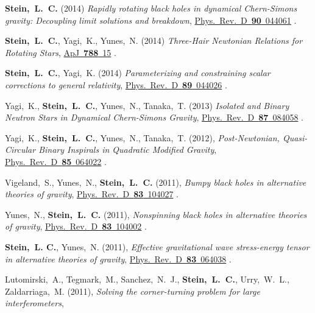 \begin{etaremune}[start=\value{pubCounter}]
\item
  {\bf Stein,~L.~C.}
  (2014)
  {\it Rapidly rotating black holes in dynamical Chern-Simons gravity:
    Decoupling limit solutions and breakdown},
  \href{http://dx.doi.org/10.1103/PhysRevD.90.044061}{Phys.~Rev.~D~{\bf 90}~044061}
  .
\item
  {\bf Stein,~L.~C.}, Yagi,~K., Yunes,~N.
  (2014)
  {\it Three-Hair Newtonian Relations for Rotating Stars},
  \href{http://dx.doi.org/10.1088/0004-637X/788/1/15}{ApJ~{\bf 788}~15}
  .
\item
  {\bf Stein,~L.~C.}, Yagi,~K.
  (2014)
  {\it Parameterizing and constraining scalar corrections to general relativity},
  \href{http://dx.doi.org/10.1103/PhysRevD.89.044026}{Phys.~Rev.~D~{\bf 89}~044026}
  .
\item
  Yagi,~K., {\bf Stein,~L.~C.}, Yunes,~N., Tanaka,~T.
  (2013)
  {\it Isolated and Binary Neutron Stars in Dynamical Chern-Simons Gravity},
  \href{http://dx.doi.org/10.1103/PhysRevD.87.084058}{Phys.~Rev.~D~{\bf 87}~084058}
  .
\item
  Yagi,~K., {\bf Stein,~L.~C.}, Yunes,~N., Tanaka,~T.
  (2012),
  {\it Post-Newtonian, Quasi-Circular Binary Inspirals in Quadratic Modified Gravity},
  \href{http://dx.doi.org/10.1103/PhysRevD.85.064022}{Phys.~Rev.~D~{\bf 85}~064022}
  .
\item
  Vigeland,~S., Yunes,~N., {\bf Stein,~L.~C.}
  (2011),
  {\it Bumpy black holes in alternative theories of gravity},
  \href{http://dx.doi.org/10.1103/PhysRevD.83.104027}{Phys.~Rev.~D~{\bf 83}~104027}
  .
\item
  Yunes,~N., {\bf Stein,~L.~C.}
  (2011),
  {\it Nonspinning black holes in alternative theories of gravity},
  \href{http://dx.doi.org/10.1103/PhysRevD.83.104002}{Phys.~Rev.~D~{\bf 83}~104002}
  .
\item
  {\bf Stein,~L. C.}, Yunes,~N.
  (2011),
  {\it Effective gravitational wave stress-energy tensor in
    alternative theories of gravity},
  \href{http://dx.doi.org/10.1103/PhysRevD.83.064038}{Phys.~Rev.~D~{\bf 83}~064038}
  .
\item
  Lutomirski,~A., Tegmark,~M., Sanchez,~N.~J., {\bf
    Stein,~L.~C.}, Urry,~W.~L., Zaldarriaga,~M.
  (2011),
  {\it Solving the corner-turning problem for large interferometers},

\end{etaremune}
